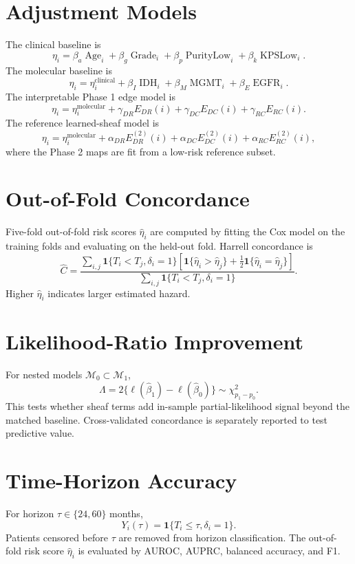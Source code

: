 \documentclass[11pt]{article}
\begin{document}
\section{Adjustment Models}
The clinical baseline is
\[
\eta_i=\beta_a\operatorname{Age}_i+\beta_g\operatorname{Grade}_i+
\beta_p\operatorname{PurityLow}_i+\beta_k\operatorname{KPSLow}_i.
\]
The molecular baseline is
\[
\eta_i=\eta_i^{\text{clinical}}+\beta_I\operatorname{IDH}_i+\beta_M\operatorname{MGMT}_i+\beta_E\operatorname{EGFR}_i.
\]
The interpretable Phase 1 edge model is
\[
\eta_i=\eta_i^{\text{molecular}}+
\gamma_{DR}E_{DR}(i)+\gamma_{DC}E_{DC}(i)+\gamma_{RC}E_{RC}(i).
\]
The reference learned-sheaf model is
\[
\eta_i=\eta_i^{\text{molecular}}+
\alpha_{DR}E^{(2)}_{DR}(i)+\alpha_{DC}E^{(2)}_{DC}(i)+\alpha_{RC}E^{(2)}_{RC}(i),
\]
where the Phase 2 maps are fit from a low-risk reference subset.

\section{Out-of-Fold Concordance}
Five-fold out-of-fold risk scores $\widehat\eta_i$ are computed by fitting the Cox model on the training folds and evaluating on the held-out fold. Harrell concordance is
\[
\widehat C=
\frac{
\sum_{i,j}\mathbf{1}\{T_i<T_j,\delta_i=1\}
\left[\mathbf{1}\{\widehat\eta_i>\widehat\eta_j\}+\frac12\mathbf{1}\{\widehat\eta_i=\widehat\eta_j\}\right]
}{
\sum_{i,j}\mathbf{1}\{T_i<T_j,\delta_i=1\}
}.
\]
Higher $\widehat\eta_i$ indicates larger estimated hazard.

\section{Likelihood-Ratio Improvement}
For nested models $\mathcal{M}_0\subset\mathcal{M}_1$,
\[
\Lambda=2\{\ell(\widehat\beta_1)-\ell(\widehat\beta_0)\}
\sim\chi^2_{p_1-p_0}.
\]
This tests whether sheaf terms add in-sample partial-likelihood signal beyond the matched baseline. Cross-validated concordance is separately reported to test predictive value.

\section{Time-Horizon Accuracy}
For horizon $\tau\in\{24,60\}$ months,
\[
Y_i(\tau)=\mathbf{1}\{T_i\le \tau,\delta_i=1\}.
\]
Patients censored before $\tau$ are removed from horizon classification. The out-of-fold risk score $\widehat\eta_i$ is evaluated by AUROC, AUPRC, balanced accuracy, and F1.
\end{document}
